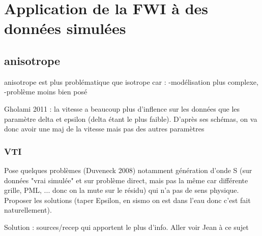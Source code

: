 \chapter{Application de la FWI à des données simulées}


\section{anisotrope}

anisotrope est plus problématique que isotrope car : 
-modélisation plus complexe,
-problème moins bien posé

Gholami 2011 : la vitesse a beaucoup plus d'inflence sur les données que les paramètre delta et epsilon (delta étant le plus faible). D'après ses schémas, on va donc avoir une maj de la vitesse mais pas des autres paramètres

\subsection{VTI}
Pose quelques problèmes (Duveneck 2008) notamment génération d'onde S (sur données "vrai simulée"  et sur problème direct, mais pas la même car différente grille, PML, ... donc on la mute sur le résidu) qui n'a pas de sens physique. Proposer les solutions (taper Epsilon, en sismo on est dans l'eau donc c'est fait naturellement).


Solution : sources/recep qui apportent le plus d'info. Aller voir Jean à ce sujet